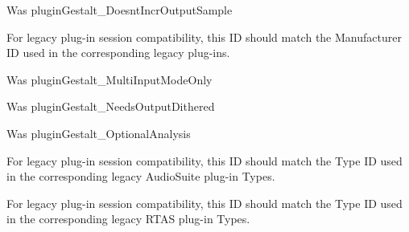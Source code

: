 \begin{DoxyRefList}
%
 Was plugin\+Gestalt\+\_\+\+Doesnt\+Incr\+Output\+Sample  
\item[Member \mbox{\hyperlink{a00674_a13e384f22825afd3db6d68395b79ce0da996465cca29a2a15291d1c788ac5728c}{AAX\+\_\+e\+Property\+\_\+\+Manufacturer\+ID}} ]\label{a00802__porting_notes000041}%
%
 For legacy plug-\/in session compatibility, this ID should match the Manufacturer ID used in the corresponding legacy plug-\/ins.  
\item[Member \mbox{\hyperlink{a00674_a13e384f22825afd3db6d68395b79ce0daa15cf3edd899af4a98fa18fcdfdeb9d6}{AAX\+\_\+e\+Property\+\_\+\+Multi\+Input\+Mode\+Only}} ]\label{a00802__porting_notes000054}%
%
 Was plugin\+Gestalt\+\_\+\+Multi\+Input\+Mode\+Only  
\item[Member \mbox{\hyperlink{a00674_a13e384f22825afd3db6d68395b79ce0da38a26f7d914d391cef1f71acfb98a2ec}{AAX\+\_\+e\+Property\+\_\+\+Needs\+Output\+Dithered}} ]\label{a00802__porting_notes000057}%
%
 Was plugin\+Gestalt\+\_\+\+Needs\+Output\+Dithered  
\item[Member \mbox{\hyperlink{a00674_a13e384f22825afd3db6d68395b79ce0da5a2bacb421fc36f890a121f01a9e72ba}{AAX\+\_\+e\+Property\+\_\+\+Optional\+Analysis}} ]\label{a00802__porting_notes000049}%
%
 Was plugin\+Gestalt\+\_\+\+Optional\+Analysis  
\item[Member \mbox{\hyperlink{a00674_a13e384f22825afd3db6d68395b79ce0dad3344696b8298a8b254add3d039ea927}{AAX\+\_\+e\+Property\+\_\+\+Plug\+In\+ID\+\_\+\+Audio\+Suite}} ]\label{a00802__porting_notes000044}%
%
 For legacy plug-\/in session compatibility, this ID should match the Type ID used in the corresponding legacy Audio\+Suite plug-\/in Types.  
\item[Member \mbox{\hyperlink{a00674_a13e384f22825afd3db6d68395b79ce0da89ca3dd6e96895cda14976c1b1ceb826}{AAX\+\_\+e\+Property\+\_\+\+Plug\+In\+ID\+\_\+\+Native}} ]\label{a00802__porting_notes000043}%
%
 For legacy plug-\/in session compatibility, this ID should match the Type ID used in the corresponding legacy RTAS plug-\/in Types.  
\item[Member \mbox{\hyperlink{a00674_a13e384f22825afd3db6d68395b79ce0da75f174df4efbeca86eaada126c1d9214}{AAX\+\_\+e\+Property\+\_\+\+Plug\+In\+ID\+\_\+\+TI}} ]\label{a00802__porting_notes000045}%
%

\end{DoxyRefList}
